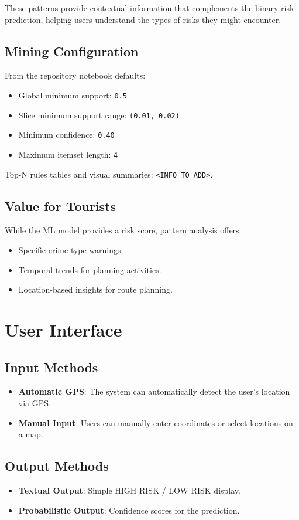 \documentclass{article}
\begin{document}
These patterns provide contextual information that complements the binary risk prediction, helping users understand the types of risks they might encounter.

\subsection{Mining Configuration}
From the repository notebook defaults:
\begin{itemize}
	\item Global minimum support: \texttt{0.5}
	\item Slice minimum support range: \texttt{(0.01, 0.02)}
	\item Minimum confidence: \texttt{0.40}
	\item Maximum itemset length: \texttt{4}
\end{itemize}

Top-N rules tables and visual summaries: \texttt{<INFO TO ADD>}.

\subsection{Value for Tourists}
While the ML model provides a risk score, pattern analysis offers:
\begin{itemize}
\item Specific crime type warnings.
\item Temporal trends for planning activities.
\item Location-based insights for route planning.
\end{itemize}

\section{User Interface}

\subsection{Input Methods}
\begin{itemize}
\item \textbf{Automatic GPS}: The system can automatically detect the user's location via GPS.
\item \textbf{Manual Input}: Users can manually enter coordinates or select locations on a map.
\end{itemize}

\subsection{Output Methods}
\begin{itemize}
\item \textbf{Textual Output}: Simple HIGH RISK / LOW RISK display.
\item \textbf{Probabilistic Output}: Confidence scores for the prediction.
\end{itemize}
\end{document}
